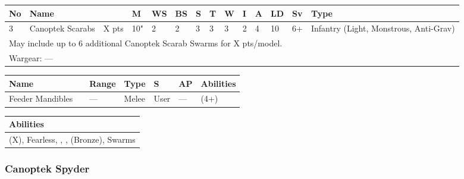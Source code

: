 \noindent
\begin{tabular}{||m{10pt} m{95pt} m{30pt} m{11pt} m{11pt} m{11pt} m{11pt} m{11pt} m{11pt} m{11pt} m{11pt} m{11pt} m{11pt} m{125pt}||}
	\hline
	No & Name & & M & WS & BS & S & T & W & I & A & LD & Sv & Type \\
	\hline
	3 & Canoptek Scarabs & X pts & 10" & 2 & 2 & 3 & 3 & 3 & 2 & 4 & 10 & 6+ & Infantry (Light, Monstrous, Anti-Grav)\\
	\hline
	\hline
	\multicolumn{14}{||Z{532 pt}||}{May include up to 6 additional Canoptek Scarab Swarms for X pts/model.}\\		
	\hline
	\hline
	\multicolumn{14}{||Z{532 pt}||}{Wargear: —}\\
	\hline
\end{tabular}

\noindent
\begin{tabular}{||m{110pt} m{30pt} m{31pt} m{55pt} m{12pt} m{12pt} m{210pt}||}
	\hline
	Name & & Range & Type & S & AP & Abilities \\
	\hline
	Feeder Mandibles & & — & Melee & User & — & \quickref{Entropic Strike} (4+) \\
	\hline
\end{tabular}

\noindent
\begin{tabular}{||m{532pt}||}
	\hline
	Abilities \\
	\hline
	\quickref{Dynasty} (X), Fearless, \quickref{Living Metal}, \quickref{Reanimation Protocols}, \quickref{Soulless Hordes} (Bronze), Swarms \\
	\hline
\end{tabular}

\newpage
\subsubsection{Canoptek Spyder}


